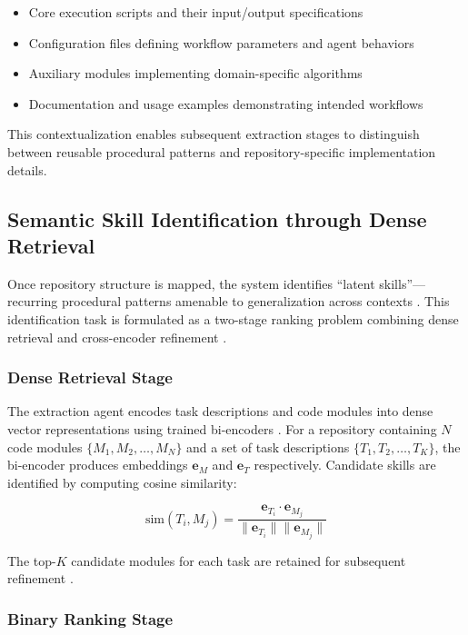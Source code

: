 \documentclass[11pt,a4paper]{article}
\begin{document}
\begin{itemize}
\item Core execution scripts and their input/output specifications
\item Configuration files defining workflow parameters and agent behaviors
\item Auxiliary modules implementing domain-specific algorithms
\item Documentation and usage examples demonstrating intended workflows
\end{itemize}

This contextualization enables subsequent extraction stages to distinguish between reusable procedural patterns and repository-specific implementation details.

\subsection{Semantic Skill Identification through Dense Retrieval}

Once repository structure is mapped, the system identifies ``latent skills''---recurring procedural patterns amenable to generalization across contexts \cite{ceur2024recskill, huggingface2024programmatic}. This identification task is formulated as a two-stage ranking problem combining dense retrieval and cross-encoder refinement \cite{ceur2024recskill}.

\subsubsection{Dense Retrieval Stage}

The extraction agent encodes task descriptions and code modules into dense vector representations using trained bi-encoders \cite{ceur2024recskill}. For a repository containing $N$ code modules $\{M_1, M_2, \ldots, M_N\}$ and a set of task descriptions $\{T_1, T_2, \ldots, T_K\}$, the bi-encoder produces embeddings $\mathbf{e}_M$ and $\mathbf{e}_T$ respectively. Candidate skills are identified by computing cosine similarity:

\begin{equation}
\text{sim}(T_i, M_j) = \frac{\mathbf{e}_{T_i} \cdot \mathbf{e}_{M_j}}{\|\mathbf{e}_{T_i}\| \|\mathbf{e}_{M_j}\|}
\end{equation}

The top-$K$ candidate modules for each task are retained for subsequent refinement \cite{ceur2024recskill}.

\subsubsection{Binary Ranking Stage}
\end{document}
